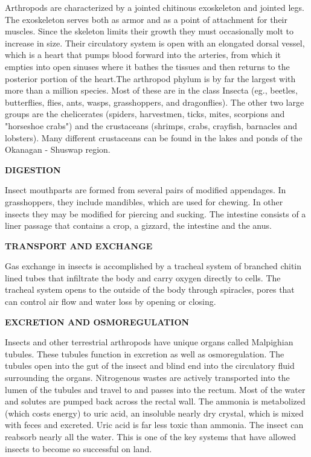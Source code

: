 \documentclass[
]{book}
\begin{document}
Arthropods are characterized by a jointed chitinous exoskeleton and jointed legs. The exoskeleton serves both as armor and as a point of attachment for their muscles. Since the skeleton limits their growth they must occasionally molt to increase in size. Their circulatory system is open with an elongated dorsal vessel, which is a heart that pumps blood forward into the arteries, from which it empties into open sinuses where it bathes the tissues and then returns
to the posterior portion of the heart.The arthropod phylum is by far the largest with more than a million species. Most of these are in the class Insecta (eg., beetles, butterflies, flies, ants, wasps, grasshoppers, and dragonflies). The other two large groups are the chelicerates (spiders, harvestmen, ticks, mites, scorpions and "horseshoe crabs") and the crustaceans (shrimps, crabs, crayfish, barnacles and lobsters). Many different crustaceans can be found in the lakes and ponds of the Okanagan - Shuswap region.

\textbf{DIGESTION}

Insect mouthparts are formed from several pairs of modified appendages. In grasshoppers, they include mandibles, which are used for chewing. In other insects they may be modified for piercing and sucking. The intestine consists of a liner passage that contains a crop, a gizzard, the intestine and the anus.

\textbf{TRANSPORT AND EXCHANGE}

Gas exchange in insects is accomplished by a tracheal system of branched chitin lined tubes that infiltrate the body and carry oxygen directly to cells. The tracheal system opens to the outside of the body through spiracles, pores that can control air flow and water loss by opening or closing.

\textbf{EXCRETION AND OSMOREGULATION}

Insects and other terrestrial arthropods have unique organs called Malpighian tubules. These tubules function in excretion as well as osmoregulation. The tubules open into the gut of the insect and blind end into the circulatory fluid surrounding the organs. Nitrogenous wastes are actively transported into the lumen of the tubules and travel to and passes into the rectum. Most of the water and solutes are pumped back across the rectal wall. The ammonia is metabolized (which costs energy) to uric acid, an insoluble nearly dry crystal, which is mixed with feces and excreted. Uric acid is far less toxic than ammonia. The insect can reabsorb nearly all the water. This is one of the key systems that have allowed insects to become so successful on land.
\end{document}
